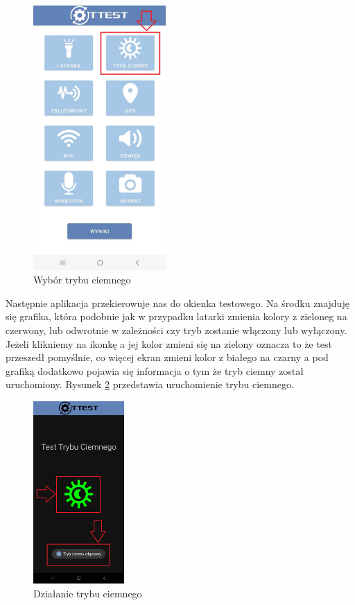 \begin{figure}[!hbt]
	\begin{center}
		\includegraphics[angle=360, width=0.45\textwidth]{rys/punkt6/menu2.jpg}
		\caption{Wybór trybu ciemnego}
		\label{rys:menu2}
	\end{center}
\end{figure}

Następnie aplikacja przekierowuje nas do okienka testowego. Na środku znajduję się grafika, która podobnie jak w przypadku latarki zmienia kolory z zieloneg na czerwony, lub odwrotnie w zależności czy tryb zostanie włączony lub wyłączony. Jeżeli klikniemy na ikonkę a jej kolor zmieni się na zielony oznacza to że test przeszedł pomyślnie, co więcej ekran zmieni kolor z białego na czarny a pod grafiką dodatkowo pojawia się informacja o tym że tryb ciemny został uruchomiony. Rysunek \ref{rys:tryb ciemny} przedstawia uruchomienie trybu ciemnego.

\newpage


\begin{figure}[!hbt]
	\begin{center}
		\includegraphics[angle=360, width=0.31\textwidth]{rys/punkt6/tryb ciemny.png}
		\caption{Działanie trybu ciemnego}
		\label{rys:tryb ciemny}
	\end{center}
\end{figure}


